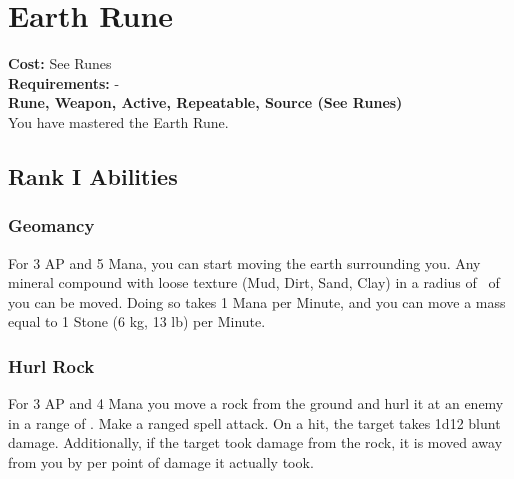 \section{Earth Rune}\label{rune:earth}
\textbf{Cost:} See Runes\\
\textbf{Requirements:} -\\
\textbf{Rune, Weapon, Active, Repeatable, Source (See Runes)}\\
You have mastered the Earth Rune.

\subsection{Rank I Abilities}

\subsubsection{Geomancy}
For 3 AP and 5 Mana, you can start moving the earth surrounding you.
Any mineral compound with loose texture (Mud, Dirt, Sand, Clay) in a radius of~ of you can be moved.
Doing so takes 1 Mana per Minute, and you can move a mass equal to 1 Stone (6 kg, 13 lb) per Minute.

\subsubsection{Hurl Rock}
For 3 AP and 4 Mana you move a rock from the ground and hurl it at an enemy in a range of .
Make a ranged spell attack.
On a hit, the target takes 1d12 blunt damage.
Additionally, if the target took damage from the rock, it is moved away from you by  per point of damage it actually took.